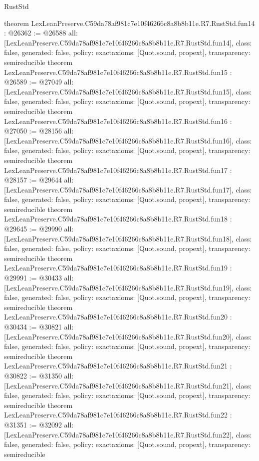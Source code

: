 \begin{lexlean}{RustStd}
\begin{coremodule}
{}
theorem LexLeanPreserve.C59da78af981c7e10f46266c8a8b8b11e.R7.RustStd.fun14 : @26362 := @26588 {
  all: [LexLeanPreserve.C59da78af981c7e10f46266c8a8b8b11e.R7.RustStd.fun14],
  class: false,
  generated: false,
  policy: exact{axioms: [Quot.sound, propext]},
  transparency: semireducible
}
theorem LexLeanPreserve.C59da78af981c7e10f46266c8a8b8b11e.R7.RustStd.fun15 : @26589 := @27049 {
  all: [LexLeanPreserve.C59da78af981c7e10f46266c8a8b8b11e.R7.RustStd.fun15],
  class: false,
  generated: false,
  policy: exact{axioms: [Quot.sound, propext]},
  transparency: semireducible
}
theorem LexLeanPreserve.C59da78af981c7e10f46266c8a8b8b11e.R7.RustStd.fun16 : @27050 := @28156 {
  all: [LexLeanPreserve.C59da78af981c7e10f46266c8a8b8b11e.R7.RustStd.fun16],
  class: false,
  generated: false,
  policy: exact{axioms: [Quot.sound, propext]},
  transparency: semireducible
}
theorem LexLeanPreserve.C59da78af981c7e10f46266c8a8b8b11e.R7.RustStd.fun17 : @28157 := @29644 {
  all: [LexLeanPreserve.C59da78af981c7e10f46266c8a8b8b11e.R7.RustStd.fun17],
  class: false,
  generated: false,
  policy: exact{axioms: [Quot.sound, propext]},
  transparency: semireducible
}
theorem LexLeanPreserve.C59da78af981c7e10f46266c8a8b8b11e.R7.RustStd.fun18 : @29645 := @29990 {
  all: [LexLeanPreserve.C59da78af981c7e10f46266c8a8b8b11e.R7.RustStd.fun18],
  class: false,
  generated: false,
  policy: exact{axioms: [Quot.sound, propext]},
  transparency: semireducible
}
theorem LexLeanPreserve.C59da78af981c7e10f46266c8a8b8b11e.R7.RustStd.fun19 : @29991 := @30433 {
  all: [LexLeanPreserve.C59da78af981c7e10f46266c8a8b8b11e.R7.RustStd.fun19],
  class: false,
  generated: false,
  policy: exact{axioms: [Quot.sound, propext]},
  transparency: semireducible
}
theorem LexLeanPreserve.C59da78af981c7e10f46266c8a8b8b11e.R7.RustStd.fun20 : @30434 := @30821 {
  all: [LexLeanPreserve.C59da78af981c7e10f46266c8a8b8b11e.R7.RustStd.fun20],
  class: false,
  generated: false,
  policy: exact{axioms: [Quot.sound, propext]},
  transparency: semireducible
}
theorem LexLeanPreserve.C59da78af981c7e10f46266c8a8b8b11e.R7.RustStd.fun21 : @30822 := @31350 {
  all: [LexLeanPreserve.C59da78af981c7e10f46266c8a8b8b11e.R7.RustStd.fun21],
  class: false,
  generated: false,
  policy: exact{axioms: [Quot.sound, propext]},
  transparency: semireducible
}
theorem LexLeanPreserve.C59da78af981c7e10f46266c8a8b8b11e.R7.RustStd.fun22 : @31351 := @32092 {
  all: [LexLeanPreserve.C59da78af981c7e10f46266c8a8b8b11e.R7.RustStd.fun22],
  class: false,
  generated: false,
  policy: exact{axioms: [Quot.sound, propext]},
  transparency: semireducible
}
\end{coremodule}
\end{lexlean}
